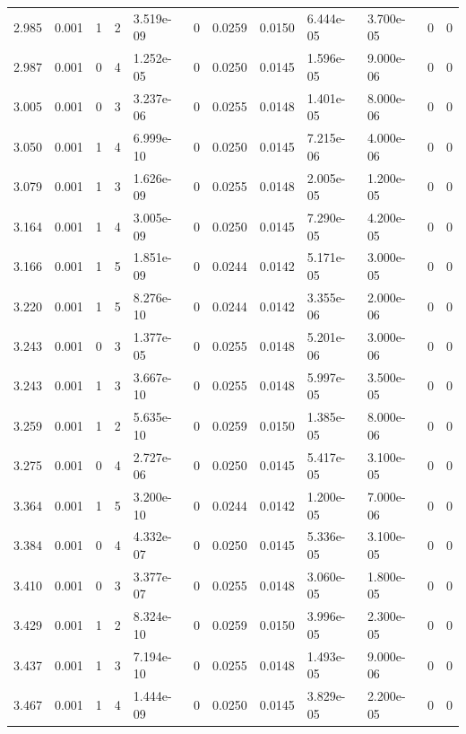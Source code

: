 \documentclass[preview]{standalone}
\begin{document}
{{{\begin{tabular}{L{1.2cm}C{1.2cm} C{0.3cm}C{0.5cm} C{1.4cm}C{1.4cm} C{1.4cm}C{1.4cm} C{1.6cm}C{1.6cm} C{1.6cm}C{1.6cm}}
  2.985  &  0.001  & 1     &  2 &  3.519e-09  & 0  &  0.0259&   0.0150& 6.444e-05 & 3.700e-05   &  0 & 0  \\ 
  2.987  &  0.001  & 0     &  4 &  1.252e-05  & 0  &  0.0250&   0.0145& 1.596e-05 & 9.000e-06   &  0 & 0  \\ 
  3.005  &  0.001  & 0     &  3 &  3.237e-06  & 0  &  0.0255&   0.0148& 1.401e-05 & 8.000e-06   &  0 & 0  \\ 
  3.050  &  0.001  & 1     &  4 &  6.999e-10  & 0  &  0.0250&   0.0145& 7.215e-06 & 4.000e-06   &  0 & 0  \\ 
  3.079  &  0.001  & 1     &  3 &  1.626e-09  & 0  &  0.0255&   0.0148& 2.005e-05 & 1.200e-05   &  0 & 0  \\ 
  3.164  &  0.001  & 1     &  4 &  3.005e-09  & 0  &  0.0250&   0.0145& 7.290e-05 & 4.200e-05   &  0 & 0  \\ 
  3.166  &  0.001  & 1     &  5 &  1.851e-09  & 0  &  0.0244&   0.0142& 5.171e-05 & 3.000e-05   &  0 & 0  \\ 
  3.220  &  0.001  & 1     &  5 &  8.276e-10  & 0  &  0.0244&   0.0142& 3.355e-06 & 2.000e-06   &  0 & 0  \\ 
  3.243  &  0.001  & 0     &  3 &  1.377e-05  & 0  &  0.0255&   0.0148& 5.201e-06 & 3.000e-06   &  0 & 0  \\ 
  3.243  &  0.001  & 1     &  3 &  3.667e-10  & 0  &  0.0255&   0.0148& 5.997e-05 & 3.500e-05   &  0 & 0  \\ 
  3.259  &  0.001  & 1     &  2 &  5.635e-10  & 0  &  0.0259&   0.0150& 1.385e-05 & 8.000e-06   &  0 & 0  \\ 
  3.275  &  0.001  & 0     &  4 &  2.727e-06  & 0  &  0.0250&   0.0145& 5.417e-05 & 3.100e-05   &  0 & 0  \\ 
  3.364  &  0.001  & 1     &  5 &  3.200e-10  & 0  &  0.0244&   0.0142& 1.200e-05 & 7.000e-06   &  0 & 0  \\ 
  3.384  &  0.001  & 0     &  4 &  4.332e-07  & 0  &  0.0250&   0.0145& 5.336e-05 & 3.100e-05   &  0 & 0  \\ 
  3.410  &  0.001  & 0     &  3 &  3.377e-07  & 0  &  0.0255&   0.0148& 3.060e-05 & 1.800e-05   &  0 & 0  \\ 
  3.429  &  0.001  & 1     &  2 &  8.324e-10  & 0  &  0.0259&   0.0150& 3.996e-05 & 2.300e-05   &  0 & 0  \\ 
  3.437  &  0.001  & 1     &  3 &  7.194e-10  & 0  &  0.0255&   0.0148& 1.493e-05 & 9.000e-06   &  0 & 0  \\ 
  3.467  &  0.001  & 1     &  4 &  1.444e-09  & 0  &  0.0250&   0.0145& 3.829e-05 & 2.200e-05   &  0 & 0  \\ 

\end{tabular}}}}
\end{document}

